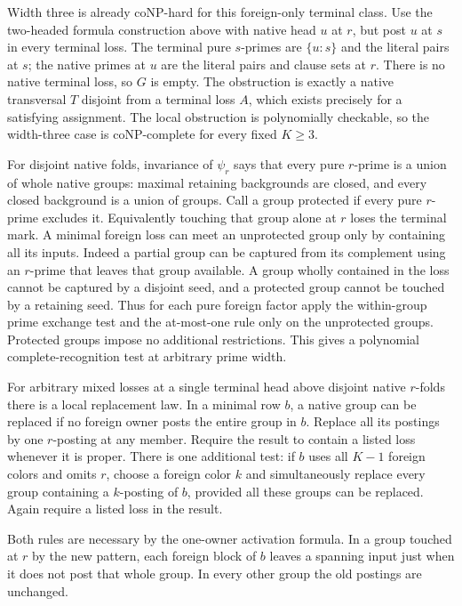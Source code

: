 Width three is already coNP-hard for this foreign-only
terminal class. Use the two-headed formula construction
above with native head $u$ at $r$, but post $u$ at $s$
in every terminal loss. The terminal pure $s$-primes
are $\{u:s\}$ and the literal pairs at $s$; the native
primes at $u$ are the literal pairs and clause sets at
$r$. There is no native terminal loss, so $G$ is empty.
The obstruction is exactly a native transversal $T$
disjoint from a terminal loss $A$, which exists precisely
for a satisfying assignment. The local obstruction is
polynomially checkable, so the width-three case is
coNP-complete for every fixed $K\geq3$.

For disjoint native folds, invariance of $\psi_r$ says
that every pure $r$-prime is a union of whole native
groups: maximal retaining backgrounds are closed, and
every closed background is a union of groups. Call a
group protected if every pure $r$-prime excludes it.
Equivalently touching that group alone at $r$ loses
the terminal mark. A minimal foreign loss can meet an
unprotected group only by containing all its inputs.
Indeed a partial group can be captured from its
complement using an $r$-prime that leaves that group
available. A group wholly contained in the loss cannot
be captured by a disjoint seed, and a protected group
cannot be touched by a retaining seed. Thus for each
pure foreign factor apply the within-group prime
exchange test and the at-most-one rule only on the
unprotected groups. Protected groups impose no
additional restrictions. This gives a polynomial
complete-recognition test at arbitrary prime width.

For arbitrary mixed losses at a single terminal head
above disjoint native $r$-folds there is a local
replacement law. In a minimal row $b$, a native group
can be replaced if no foreign owner posts the entire
group in $b$. Replace all its postings by one $r$-posting
at any member. Require the result to contain a listed
loss whenever it is proper. There is one additional
test: if $b$ uses all $K-1$ foreign colors and omits $r$,
choose a foreign color $k$ and simultaneously replace
every group containing a $k$-posting of $b$, provided
all these groups can be replaced. Again require a
listed loss in the result.

Both rules are necessary by the one-owner activation
formula. In a group touched at $r$ by the new pattern,
each foreign block of $b$ leaves a spanning input just
when it does not post that whole group. In every other
group the old postings are unchanged.

